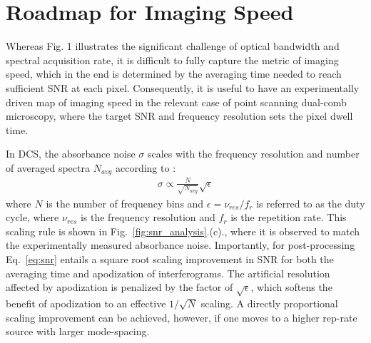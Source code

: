 \documentclass{optica-article}
\begin{document}



\section{Roadmap for Imaging Speed}
Whereas Fig. 1 illustrates the significant challenge of optical bandwidth and spectral acquisition rate, it is difficult to fully capture the metric of imaging speed, which in the end is determined by the averaging time needed to reach sufficient SNR at each pixel. Consequently, it is useful to have an experimentally driven map of imaging speed in the relevant case of point scanning dual-comb microscopy, where the target SNR and frequency resolution sets the pixel dwell time.

In DCS, the absorbance noise $\sigma$ scales with the frequency resolution and number of averaged spectra $N_{avg}$ according to \cite{newburySensitivityCoherentDualcomb2010}: 
% 
\begin{align}
    \sigma \propto \frac{N}{\sqrt{N_{avg}}}\sqrt{\epsilon}
    \label{eq:snr}
\end{align}
% 
where $N$ is the number of frequency bins and $\epsilon=\nu_{res}/f_{r}$ is referred to as the duty cycle, where $\nu_{res}$ is the frequency resolution and $f_r$ is the repetition rate. This scaling rule is shown in \mbox{Fig. \ref{fig:snr_analysis}.(c).}, where it is observed to match the experimentally measured absorbance noise. Importantly, for post-processing \mbox{Eq. \ref{eq:snr}} entails a square root scaling improvement in SNR for both the averaging time and apodization of interferograms. The artificial resolution affected by apodization is penalized by the factor of $\sqrt{\epsilon}$, which softens the benefit of apodization to an effective $1/\sqrt{N}$ scaling. A directly proportional scaling improvement can be achieved, however, if one moves to a higher rep-rate source with larger mode-spacing.
\end{document}
